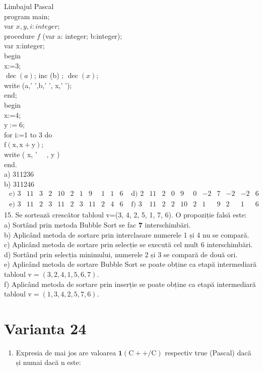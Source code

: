 \documentclass[10pt]{article}
\begin{document}
Limbajul Pascal\\
program main;\\
var $x, y, i: i n t e g e r ;$\\
procedure $f$ (var a: integer; b:integer);\\
var x:integer;\\
begin\\
x:=3;\\
$\operatorname{dec}(a)$; inc (b) ; $\operatorname{dec}(x)$;\\
write (a,' ',b,' ', x,' ');\\
end;\\
begin\\
x:=4;\\
$\mathrm{y}:=6$;\\
for i:=1 to 3 do\\
$\mathrm{f}(\mathrm{x}, \mathrm{x}+\mathrm{y})$;\\
write ( x, ' $\quad$, y )\\
end.\\
a) 311236\\
b) 311246\\
$\begin{array}{llllllllllllllllllllll}\text { c) } 3 & 11 & 3 & 2 & 10 & 2 & 1 & 9 & 1 & 1 & 6 & \text { d) } 2 & 11 & 2 & 0 & 9 & 0 & -2 & 7 & -2 & -2 & 6 \\ \text { e) } 3 & 11 & 2 & 3 & 11 & 2 & 3 & 11 & 2 & 4 & 6 & \text { f) } 3 & 11 & 2 & 2 & 10 & 2 & 1 & 9 & 2 & 1 & 6\end{array}$\\
15. Se sortează crescător tabloul v=(3, 4, 2, 5, 1, 7, 6). O propoziție falsă este:\\
a) Sortând prin metoda Bubble Sort se fac $\mathbf{7}$ interschimbări.\\
b) Aplicând metoda de sortare prin interclasare numerele 1 și 4 nu se compară.\\
c) Aplicând metoda de sortare prin selecție se execută cel mult 6 interschimbări.\\
d) Sortând prin selecția minimului, numerele 2 și 3 se compară de două ori.\\
e) Aplicând metoda de sortare Bubble Sort se poate obține ca etapă intermediară tabloul $\mathrm{v}=(3,2,4,1,5,6,7)$.\\
f) Aplicând metoda de sortare prin inserție se poate obține ca etapă intermediară tabloul $\mathrm{v}=(1,3,4,2,5,7,6)$.

\section*{Varianta 24}
\begin{enumerate}
  \item Expresia de mai jos are valoarea $\mathbf{1}(\mathrm{C}++/ \mathrm{C})$ respectiv true (Pascal) dacă și numai dacă n este:
\end{enumerate}
\end{document}
